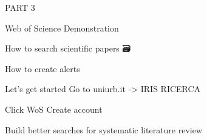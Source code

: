 \documentclass[
  ignorenonframetext,
]{beamer}
\begin{document}
\begin{frame}{PART 3}
\protect\hypertarget{part-3}{}
\begin{block}{Web of Science Demonstration 🔑}
\protect\hypertarget{web-of-science-demonstration}{}
\end{block}

\begin{block}{How to search scientific papers 🗃️}
\protect\hypertarget{how-to-search-scientific-papers}{}
\end{block}

\begin{block}{How to create alerts 🔔}
\protect\hypertarget{how-to-create-alerts}{}
\end{block}
\end{frame}

\begin{frame}{Let's get started}
\protect\hypertarget{lets-get-started}{}
Go to uniurb.it -\textgreater{} IRIS RICERCA

Click WoS Create account
\end{frame}

\begin{frame}{Build better searches for systematic literature review}
\protect\hypertarget{build-better-searches-for-systematic-literature-review}{}
\end{frame}
\end{document}
